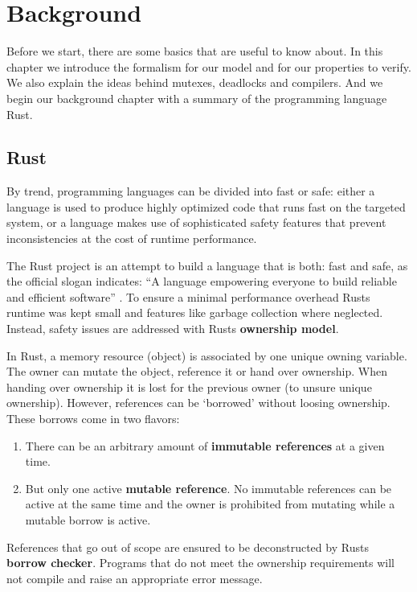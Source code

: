 \chapter{Background}
Before we start, there are some basics that are useful to know about.
In this chapter we introduce the formalism for our model and for our properties to verify.
We also explain the ideas behind mutexes, deadlocks and compilers.
And we begin our background chapter with a summary of the programming language Rust.

\section{Rust}
\label{rel_rust}
By trend, programming languages can be divided into fast or safe\cite{speedSafety}: 
either a language is used to produce highly optimized code that runs fast on the targeted system,
or a language makes use of sophisticated safety features that prevent inconsistencies at the cost of runtime performance.

The Rust project is an attempt to build a language that is both: fast and safe, 
as the official slogan indicates: ``A language empowering everyone
to build reliable and efficient software'' \cite{rustSite}.
To ensure a minimal performance overhead Rusts runtime was kept small\cite[Chapter 16.1]{klabnik2018rust} and features like garbage collection where neglected\cite[Chapter 4]{klabnik2018rust}.
Instead, safety issues are addressed with Rusts \textbf{ownership model}\cite{Matsakis:2014:RL:2692956.2663188}.

In Rust, a memory resource (object) is associated by one unique owning variable.
The owner can mutate the object, reference it or hand over ownership.
When handing over ownership it is lost for the previous owner (to unsure unique ownership).
However, references can be `borrowed' without loosing ownership.
These borrows come in two flavors:
\begin{enumerate}
  \item There can be an arbitrary amount of \textbf{immutable references} at a given time.
  \item But only one active \textbf{mutable reference}. 
  No immutable references can be active at the same time and the owner is prohibited from mutating while a mutable borrow is active.
\end{enumerate}
References that go out of scope are ensured to be deconstructed by Rusts \textbf{borrow checker}. 
Programs that do not meet the ownership requirements will not compile and raise an appropriate error message.

